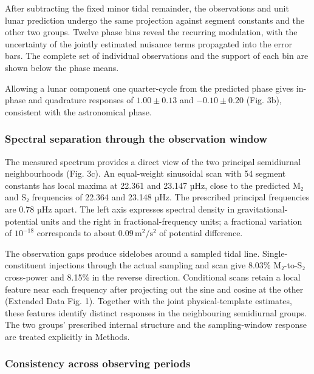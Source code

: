\documentclass[
  12pt,
  a4paper,
]{article}
\begin{document}
After subtracting the fixed minor tidal remainder, the observations and
unit lunar prediction undergo the same projection against segment
constants and the other two groups. Twelve phase bins reveal the
recurring modulation, with the uncertainty of the jointly estimated
nuisance terms propagated into the error bars. The complete set of
individual observations and the support of each bin are shown below the
phase means.

Allowing a lunar component one quarter-cycle from the predicted phase
gives in-phase and quadrature responses of \(1.00\pm0.13\) and
\(-0.10\pm0.20\) (Fig. 3b), consistent with the astronomical phase.

\hypertarget{spectral-separation-through-the-observation-window}{%
\subsubsection{Spectral separation through the observation
window}\label{spectral-separation-through-the-observation-window}}

The measured spectrum provides a direct view of the two principal
semidiurnal neighbourhoods (Fig. 3c). An equal-weight sinusoidal scan
with 54 segment constants has local maxima at 22.361 and 23.147 µHz,
close to the predicted M₂ and S₂ frequencies of 22.364 and 23.148 µHz.
The prescribed principal frequencies are 0.78 µHz apart. The left axis
expresses spectral density in gravitational-potential units and the
right in fractional-frequency units; a fractional variation of
\(10^{-18}\) corresponds to about \(0.09\,\mathrm{m^2/s^2}\) of
potential difference.

The observation gaps produce sidelobes around a sampled tidal line.
Single-constituent injections through the actual sampling and scan give
8.03\% M₂-to-S₂ cross-power and 8.15\% in the reverse direction.
Conditional scans retain a local feature near each frequency after
projecting out the sine and cosine at the other (Extended Data Fig. 1).
Together with the joint physical-template estimates, these features
identify distinct responses in the neighbouring semidiurnal groups. The
two groups' prescribed internal structure and the sampling-window
response are treated explicitly in Methods.

\hypertarget{consistency-across-observing-periods}{%
\subsubsection{Consistency across observing
periods}\label{consistency-across-observing-periods}}
\end{document}
